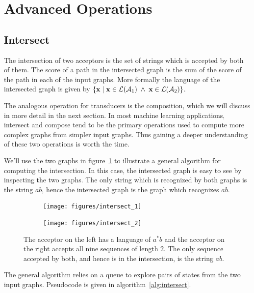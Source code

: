 \section{Advanced Operations}
\label{sec:advanced_operations}

\subsection{Intersect}

The intersection of two acceptors is the set of strings which is accepted by
both of them. The score of a path in the intersected graph is the sum of the
score of the path in each of the input graphs. More formally the language of
the intersected graph is given by $\{ {\bf x} \mid {\bf x} \in \mathcal{L}(\mathcal{A}_1) \;\land\; {\bf x}
\in \mathcal{L}(\mathcal{A}_2)\}$.

The analogous operation for transducers is the composition, which we will
discuss in more detail in the next section. In most machine learning
applications, intersect and compose tend to be the primary operations used to
compute more complex graphs from simpler input graphs. Thus gaining a deeper
understanding of these two operations is worth the time.

We'll use the two graphs in figure~\ref{fig:intersect_inputs} to illustrate a
general algorithm for computing the intersection. In this case, the intersected
graph is easy to see by inspecting the two graphs. The only string which is
recognized by both graphs is the string $ab$, hence the intersected graph is
the graph which recognizes $ab$.

\begin{figure}
    \centering
    \begin{subfigure}[b]{0.48\textwidth}
        \centering
        \texttt{[image: figures/intersect\_1]}
    \end{subfigure}
    \begin{subfigure}[b]{0.48\textwidth}
        \centering
        \texttt{[image: figures/intersect\_2]}
    \end{subfigure}
    \caption{The acceptor on the left has a language of $a^*b$ and the acceptor
    on the right accepts all nine sequences of length $2$. The only sequence
    accepted by both, and hence is in the intersection, is the string $ab$.}
    \label{fig:intersect_inputs}
\end{figure}

The general algorithm relies on a queue to explore pairs of states from the two
input graphs. Pseudocode is given in algorithm~\ref{alg:intersect}.

